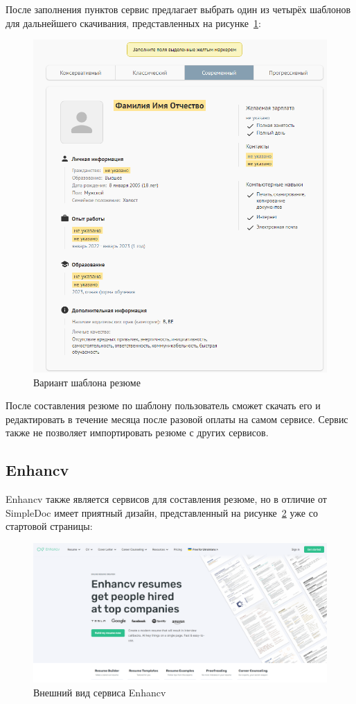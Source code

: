 \documentclass[master, och, pract]{SCWorks}
\begin{document}
После заполнения пунктов сервис предлагает выбрать один из четырёх шаблонов 
для дальнейшего скачивания, представленных на рисунке~\ref{fig:17}:
\begin{figure}[!ht]
    \centering
    \includegraphics[width=12cm]{images/image4.png}
    \caption{\label{fig:17}%
        Вариант шаблона резюме}
\end{figure}

После составления резюме по шаблону пользователь сможет скачать его и редактировать 
в течение месяца после разовой оплаты на самом сервисе.
Сервис также не позволяет импортировать резюме с других сервисов.

\subsection{Enhancv}
Enhancv также является сервисов для составления резюме, но в отличие от SimpleDoc 
имеет приятный дизайн, представленный на рисунке~\ref{fig:18} уже со стартовой страницы:
\begin{figure}[!ht]
    \centering
    \includegraphics[width=12cm]{images/image18.png}
    \caption{\label{fig:18}%
        Внешний вид сервиса Enhancv}
\end{figure}
\end{document}
